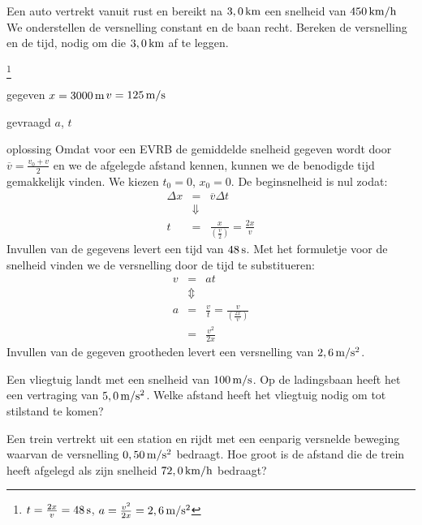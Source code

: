 \documentclass{ximera}
\begin{document}
\begin{exercise} Een auto vertrekt vanuit rust en bereikt na $3,0\rm\,km$ een snelheid van $450\rm\,km/h$ We onderstellen de versnelling constant en de baan recht. Bereken de versnelling en de tijd, nodig om die $3,0\rm\,km$ af te leggen.
\begin{oplossing}
\footnote{$t=\frac{2x}{v}=48\rm\,s$, $a=\frac{v^2}{2x}=2,6\rm\,m/s^2$}
\item[gegeven]$x=3000\rm\,m$\newline $v=125\rm\,m/s$
\item[gevraagd]$a$, $t$
\item[oplossing]Omdat voor een EVRB de gemiddelde snelheid gegeven wordt door $\overline{v}=\frac{v_0+v}{2}$ en we de afgelegde afstand kennen, kunnen we de benodigde tijd gemakkelijk vinden. We kiezen $t_0=0$, $x_0=0$. De beginsnelheid is nul zodat:
\begin{eqnarray*}
\Delta x &=& \overline{v}\Delta t \\
&\Downarrow & \\
t &=& \frac{x}{\left(\frac{v}{2}\right)} = \frac{2x}{v}
\end{eqnarray*}
Invullen van de gegevens levert een tijd van $48\rm\,s$. Met het formuletje voor de snelheid vinden we de versnelling door de tijd te substitueren:
\begin{eqnarray*}
v &=& at \\
&\Updownarrow&\\
a &=& \frac{v}{t}=\frac{v}{\left(\frac{2x}{v}\right)}\\
&=& \frac{v^2}{2x}
\end{eqnarray*}
Invullen van de gegeven grootheden levert een versnelling van $2,6\rm\,m/s^2$.
\end{oplossing}

\end{exercise}

\begin{exercise} Een vliegtuig landt met een snelheid van $100\rm\,m/s$. Op de ladingsbaan heeft het een vertraging van $5,0\rm\,m/s^2$. Welke afstand heeft het vliegtuig nodig om tot stilstand te komen?

\end{exercise}

\begin{exercise} Een trein vertrekt uit een station en rijdt met een eenparig
versnelde beweging waarvan de versnelling $0,50\rm\,m/s^2$ bedraagt.
Hoe groot is de afstand die de trein heeft afgelegd als zijn
snelheid $72,0\rm\,km/h$ bedraagt?



\end{exercise}
\end{document}
